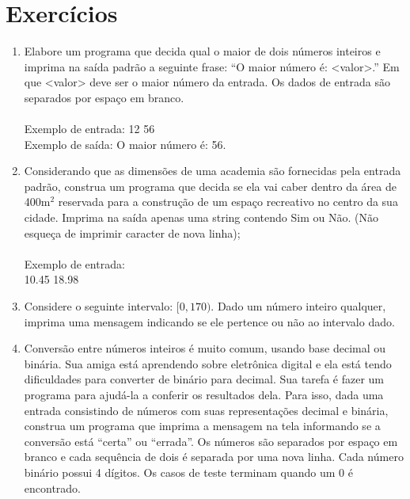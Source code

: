 \documentclass[12pt,a4paper]{book}
\begin{document}
\newpage
\section{Exercícios}

\begin{enumerate}
  \item Elabore um programa que decida qual o maior de dois números inteiros e imprima na saída padrão a seguinte     
  frase: ``O maior número é: <valor>.'' Em que <valor> deve ser o maior número da entrada. Os dados de entrada são separados por espaço em branco.\\
  \\Exemplo de entrada: 12 56
  \\Exemplo de saída: O maior número é: 56.
  
  
  \item Considerando que as dimensões de uma academia são fornecidas pela entrada padrão, construa um programa que        
  decida se ela vai caber dentro da área de 400m$^{2}$ reservada para a construção de um espaço recreativo no       
  centro da sua cidade. Imprima na saída apenas uma string contendo Sim ou Não. (Não esqueça de imprimir caracter de nova linha);\\
  \\ Exemplo de entrada: \\10.45 18.98
  
  \item Considere o seguinte intervalo: $[0, 170)$. Dado um número inteiro qualquer, imprima uma mensagem 
  indicando se ele pertence ou não ao intervalo dado.
  
  \item Conversão entre números inteiros é muito comum, usando base decimal ou binária. Sua amiga está aprendendo sobre eletrônica digital e ela está tendo dificuldades para converter de binário para decimal. Sua tarefa é fazer um programa para ajudá-la a conferir os resultados dela. Para isso, dada uma entrada consistindo de números com suas representações decimal e binária, construa um programa que imprima a mensagem na tela informando se a conversão está ``certa'' ou ``errada''. Os números são separados por espaço em branco e cada sequência de dois é separada por uma nova linha. Cada número binário possui 4 dígitos. Os casos de teste terminam quando um 0 é encontrado.\\
  
  
    \begin{minipage}{.45\textwidth}
      \centering


\end{minipage}
\end{enumerate}
\end{document}
